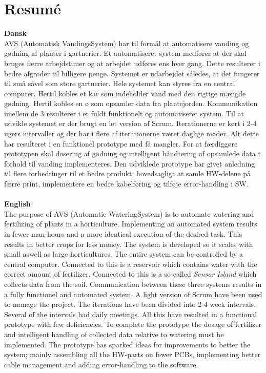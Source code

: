 \chapter{Resumé}
\textbf{Dansk}
\\
AVS (Automatisk VandingsSystem) har til formål at automatisere vanding og gødning af planter i gartnerier. Et automatiseret system medfører at der skal bruges færre arbejdstimer og at arbejdet udføres ens hver gang. Dette resulterer i bedre afgrøder til billigere penge. Systemet er udarbejdet således, at det fungerer til små såvel som store gartnerier. Hele systemet kan styres fra en central computer. Hertil kobles et kar som indeholder vand med den rigtige mængde gødning. Hertil kobles en ø som opsamler data fra plantejorden. Kommunikation imellem de 3 resulterer i et fuldt funktionelt og automatiseret system. Til at udvikle systemet er der brugt en let version af Scrum. Iterationerne er kørt i 2-4 ugers intervaller og der har i flere af iterationerne været daglige møder. Alt dette har resulteret i en funktionel prototype med få mangler. For at færdiggøre prototypen skal dosering af gødning og intelligent håndtering af opsamlede data i forhold til vanding implementeres. Den udviklede prototype har givet anledning til flere forbedringer til et bedre produkt; hovedsagligt at samle HW-delene på færre print, implementere en bedre kabelføring og tilføje error-handling i SW.
\\\\
\textbf{English}
\\
The purpose of AVS (Automatic WateringSystem) is to automate watering and fertilizing of plants in a horticulture. Implementing an automated system results in fewer man-hours and a more identical execution of the desired task. This results in better crops for less money. The system is developed so it scales with small aswell as large horticultures. The entire system can be controlled by a central computer. Connected to this is a reservoir which contains water with the correct amount of fertilizer. Connected to this is a so-called \emph{Sensor Island} which collects data from the soil. Communication between these three systems results in a fully functionel and automated system. A light version of Scrum have been used to manage the project. The iterations have been divided into 2-4 week intervals. Several of the intervals had daily meetings. All this have resulted in a functional prototype with few deficiencies. To complete the prototype the dosage of fertilizer and intelligent handling of collected data relative to watering must be implemented. The prototype has sparked ideas for improvements to better the system; mainly assembling all the HW-parts on fewer PCBs, implementing better cable management and adding error-handling to the software.